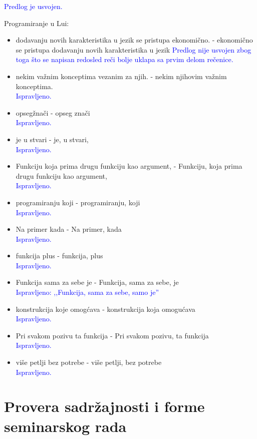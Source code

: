 \documentclass[a4paper]{report}
\newcommand{\odgovorAutora}[1]{\textcolor{blue}{#1}}
\begin{document}
{\begin{itemize}
  \odgovorAutora{Predlog je usvojen.}
\end{itemize}
Programiranje u Lui: 
\begin{itemize}
  \item dodavanju novih karakteristika u jezik se pristupa ekonomično. - ekonomično se pristupa dodavanju novih karakteristika u jezik
  \odgovorAutora{Predlog nije usvojen zbog toga što se napisan redosled reči bolje uklapa sa prvim delom rečenice.}
  \item nekim važnim konceptima vezanim za njih.  - nekim njihovim važnim konceptima.\\
  \odgovorAutora{Ispravljeno.}
  \item opsegžnači -  opseg znači \\
  \odgovorAutora{Ispravljeno.}
  \item  je u stvari - je, u stvari,\\
  \odgovorAutora{Ispravljeno.}
  \item  Funkciju koja prima drugu funkciju kao argument, - Funkciju, koja prima drugu funkciju kao argument,\\
  \odgovorAutora{Ispravljeno.}
  \item programiranju koji - programiranju, koji\\
  \odgovorAutora{Ispravljeno.}
  \item  Na primer kada -  Na primer, kada\\
  \odgovorAutora{Ispravljeno.}
  \item   funkcija plus -  funkcija, plus\\
  \odgovorAutora{Ispravljeno.}
  \item  Funkcija sama za sebe je - Funkcija, sama za sebe, je \\
  \odgovorAutora{Ispravljeno: ,,Funkcija, sama za sebe, samo je''}     
  \item  konstrukcija koje omogćava - konstrukcija koja omogućava\\
  \odgovorAutora{Ispravljeno.}
  \item   Pri svakom pozivu ta funkcija  -  Pri svakom pozivu, ta funkcija\\
  \odgovorAutora{Ispravljeno.}
  \item  više petlji bez potrebe - više petlji, bez potrebe\\
  \odgovorAutora{Ispravljeno.}
\end{itemize}
}

\section{Provera sadržajnosti i forme seminarskog rada}
\end{document}
